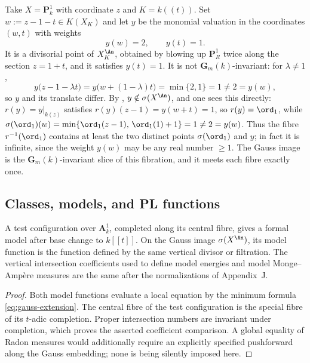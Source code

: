 \begin{example}
\label{ex:ch30-gauss-image-strict}
Take \(X=\mathbf P^1_k\) with coordinate \(z\) and \(K=k(\!(t)\!)\).  Set
\(w:=z-1-t\in K(X_K)\) and let \(y\) be the monomial valuation in the
coordinates \((w,t)\) with weights
\[
                     y(w)=2,\qquad y(t)=1 .
\]
It is a divisorial point of \(X_K^{\An}\), obtained by blowing up
\(\mathbf P^1_R\) twice along the section \(z=1+t\), and it satisfies
\(y(t)=1\).  It is not \(\mathbf G_m(k)\)-invariant: for
\(\lambda\neq1\),
\[
 y\bigl(z-1-\lambda t\bigr)
 =y\bigl(w+(1-\lambda)t\bigr)=\min\{2,1\}=1\neq2=y(w),
\]
so \(y\) and its translate differ.  By
, \(y\notin\sigma(X^{\An})\), and one sees this
directly: \(r(y)=y|_{k(z)}\) satisfies \(r(y)(z-1)=y(w+t)=1\), so
\(r(y)=\ord_1\), while
\(\sigma(\ord_1)(w)=\min\{\ord_1(z-1),\,\ord_1(1)+1\}=1\neq2=y(w)\).  Thus
the fibre \(r^{-1}(\ord_1)\) contains at least the two distinct points
\(\sigma(\ord_1)\) and \(y\); in fact it is infinite, since the weight
\(y(w)\) may be any real number \(\geq1\).  The Gauss image is the
\(\mathbf G_m(k)\)-invariant slice of this fibration, and it meets each
fibre exactly once.
\end{example}

\subsection{Classes, models, and PL functions}
\label{sec:ch30-gauss-classes}

\begin{proposition}\label{prop:gauss-model-compatibility}
A test configuration over \(\mathbf A^1_k\), completed along its central
fibre, gives a formal model after base change to \(k[[t]]\).  On the Gauss
image \(\sigma(X^{\An})\), its model function is the function defined by the
same vertical divisor or filtration.  The vertical intersection
coefficients used to define model energies and model Monge--Amp\`ere
measures are the same after the normalizations of Appendix~J.
\end{proposition}

\begin{proof}
Both model functions evaluate a local equation by the minimum formula
\eqref{eq:gauss-extension}.  The central fibre of the test configuration is
the special fibre of its \(t\)-adic completion.  Proper intersection numbers
are invariant under completion, which proves the asserted coefficient
comparison.  A global equality of Radon measures would additionally require
an explicitly specified pushforward along the Gauss embedding; none is
being silently imposed here.
\end{proof}


